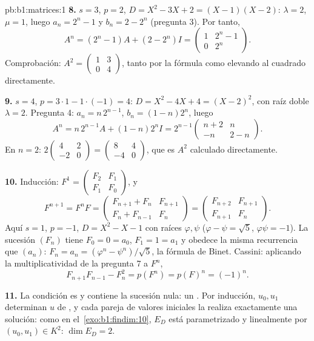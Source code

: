 \begin{solution}{pb:b1:matrices:1}
\textbf{8.} $s = 3$, $p = 2$, $D = X^2 - 3X + 2 = (X - 1)(X - 2)$:
$\lambda = 2$, $\mu = 1$, luego $a_n = 2^n - 1$ y $b_n = 2 - 2^n$
(pregunta 3). Por tanto,
\[
A^n = (2^n - 1)A + (2 - 2^n)I
= \begin{pmatrix} 1 & 2^n - 1\\ 0 & 2^n \end{pmatrix}.
\]
Comprobación: $A^2 = \begin{pmatrix} 1 & 3\\ 0 & 4\end{pmatrix}$,
tanto por la fórmula como elevando al cuadrado directamente.

\textbf{9.} $s = 4$, $p = 3\cdot1 - 1\cdot(-1) = 4$:
$D = X^2 - 4X + 4 = (X - 2)^2$, con raíz doble $\lambda = 2$.
Pregunta 4: $a_n = n\,2^{n-1}$, $b_n = (1 - n)2^n$, luego
\[
A^n = n\,2^{n-1}A + (1 - n)2^n I
= 2^{n-1}\begin{pmatrix} n + 2 & n\\ -n & 2 - n
\end{pmatrix}.
\]
En $n = 2$:
$2\begin{pmatrix} 4 & 2\\ -2 & 0\end{pmatrix} =
\begin{pmatrix} 8 & 4\\ -4 & 0 \end{pmatrix}$, que es $A^2$ calculado
directamente.

\textbf{10.} Inducción:
$F^1 = \begin{pmatrix} F_2 & F_1\\ F_1 & F_0\end{pmatrix}$, y
\[
F^{n+1} = F^n F =
\begin{pmatrix} F_{n+1} + F_n & F_{n+1}\\
F_n + F_{n-1} & F_n \end{pmatrix}
= \begin{pmatrix} F_{n+2} & F_{n+1}\\ F_{n+1} & F_n
\end{pmatrix}.
\]
Aquí $s = 1$, $p = -1$, $D = X^2 - X - 1$ con raíces $\varphi,
\psi$ ($\varphi - \psi = \sqrt5$, $\varphi\psi = -1$). La sucesión
$(F_n)$ tiene $F_0 = 0 = a_0$, $F_1 = 1 = a_1$ y obedece la misma
recurrencia que $(a_n)$: $F_n = a_n = (\varphi^n - \psi^n)/\sqrt5$,
la fórmula de Binet. Cassini: aplicando la multiplicatividad de la
pregunta 7 a $F^n$,
\[
F_{n+1}F_{n-1} - F_n^2 = p(F^n) = p(F)^n = (-1)^n .
\]

\textbf{11.} La condición es  y contiene la sucesión nula: un
. Por inducción, $u_0, u_1$ determinan $u$ de , y cada pareja de valores iniciales la realiza exactamente una
solución: como en el~\cref{exo:b1:findim:10}, $E_D$ está
parametrizado  y linealmente por $(u_0, u_1) \in K^2$:
$\dim E_D = 2$.


\end{solution}
